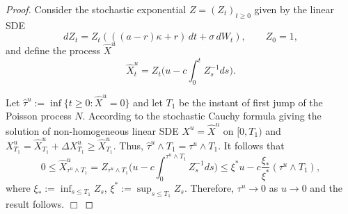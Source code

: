 \documentclass[10pt,a4paper]{amsart}
\newcommand\fdem{$\Box$}
\begin{document}
\begin{proof} 
Consider the stochastic exponential $Z=(Z_t)_{t\ge 0}$ given by the linear SDE 
$$
dZ_t=Z_t \left( ((a-r)\kappa + r) \,d t + \sigma \,dW_t \right), \qquad Z_0=1, 
$$
and define the process $\hat X^u$ 
$$
\hat X^u_t=Z_t\Big( u-c\int_0^t Z_s^{-1}ds\Big).
$$

Let $\hat \tau^ u:=\inf\{t\ge 0\colon \hat X^u=0\}$ and let $T_1$ be the instant of first jump of the Poisson process $N$. 
According to the stochastic Cauchy formula giving the solution of non-homogeneous linear SDE 
$X^u=\hat X^u$ on $[0,T_1)$ and $X^u_{T_1}=\hat X^u_{T_1}+\Delta X^u_{T_1}\ge \hat X^u_{T_1}$. Thus, $\hat \tau^ u\wedge T_1= \tau^ u\wedge T_1$. It follows that 
$$
0\le \hat X^u_{\tau^u\wedge T_1}=Z_{\tau^u\wedge T_1}\Big( u-c\int_0^{\tau^u\wedge T_1} Z_s^{-1}ds\Big)
\le \xi^* u-c\frac {\xi_*}{\xi^*}(\tau^u\wedge T_1),
$$
where $\xi_*:=\inf_{s\le T_1}Z_s$, $\xi^*:=\sup_{s\le T_1}Z_s$. Therefore, $\tau^ u\to 0$ as $u\to 0$ and the result follows.
\fdem
\end{proof} 
\end{document}
